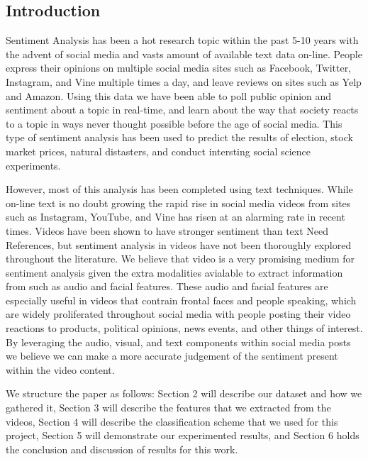 \documentclass[twoside]{article}
\begin{document}
\begin{multicols}{2} %

\section{Introduction}
Sentiment Analysis has been a hot research topic within the past 5-10 years with the advent of social media and vasts amount of available text data on-line.
People express their opinions on multiple social media sites such as Facebook, Twitter, Instagram, and Vine multiple times a day, and leave reviews on sites such as Yelp and Amazon.
Using this data we have been able to poll public opinion and sentiment about a topic in real-time, and learn about the way that society reacts to a topic in ways never thought possible before the age of social media.
This type of sentiment analysis has been used to predict the results of election, stock market prices, natural distasters, and conduct intersting social science experiments.

However, most of this analysis has been completed using text techniques.  
While on-line text is no doubt growing the rapid rise in social media videos from sites such as Instagram, YouTube, and Vine has risen at an alarming rate in recent times.
Videos have been shown to have stronger sentiment than text {\color{red} Need References}, but sentiment analysis in videos have not been thoroughly explored throughout the literature.
We believe that video is a very promising medium for sentiment analysis given the extra modalities avialable to extract information from such as audio and facial features.
These audio and facial features are especially useful in videos that contrain frontal faces and people speaking, which are widely proliferated throughout social media with people posting their video reactions to products, political opinions, news events, and other things of interest.
By leveraging the audio, visual, and text components within social media posts we believe we can make a more accurate judgement of the sentiment present within the video content.

We structure the paper as follows: Section 2 will describe our dataset and how we gathered it, Section 3 will describe the features that we extracted from the videos, Section 4 will describe the classification scheme that we used for this project, Section 5 will demonstrate our experimented results, and Section 6 holds the conclusion and discussion of results for this work. 


\end{multicols}
\end{document}
